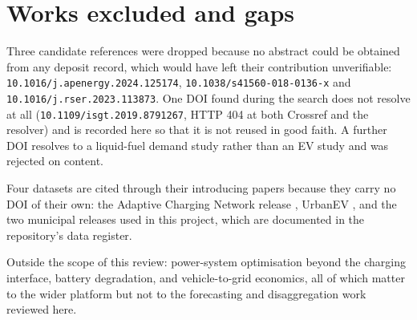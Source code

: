 \documentclass[11pt,a4paper]{article}
\newcommand{\code}[1]{\texttt{\small #1}}
\begin{document}
\section{Works excluded and gaps}\label{sec:gaps}

Three candidate references were dropped because no abstract could be obtained from any deposit
record, which would have left their contribution unverifiable:
\code{10.1016/j.apenergy.2024.125174}, \code{10.1038/s41560-018-0136-x} and
\code{10.1016/j.rser.2023.113873}. One DOI found during the search does not resolve at all
(\code{10.1109/isgt.2019.8791267}, HTTP 404 at both Crossref and the resolver) and is recorded here so
that it is not reused in good faith. A further DOI resolves to a liquid-fuel demand study rather than
an EV study and was rejected on content.

Four datasets are cited through their introducing papers because they carry no DOI of their own: the
Adaptive Charging Network release \cite{Lee2021ACNSim}, UrbanEV \cite{Li2025UrbanEV}, and the two
municipal releases used in this project, which are documented in the repository's data register.

Outside the scope of this review: power-system optimisation beyond the charging interface, battery
degradation, and vehicle-to-grid economics, all of which matter to the wider platform but not to the
forecasting and disaggregation work reviewed here.



\end{document}
